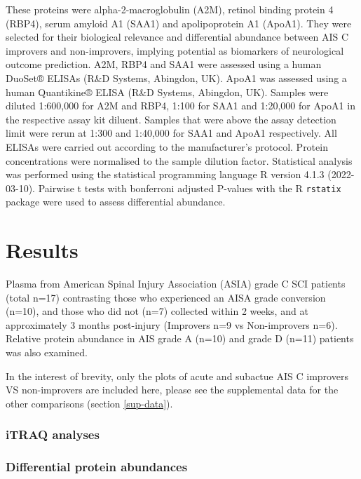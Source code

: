 \documentclass[9pt,lineno]{elife}
\begin{document}
These proteins were alpha-2-macroglobulin (A2M), retinol binding protein 4 (RBP4), serum amyloid A1 (SAA1) and apolipoprotein A1 (ApoA1).
They were selected for their biological relevance and differential abundance between AIS C improvers and non-improvers, implying potential as biomarkers of neurological outcome prediction.
A2M, RBP4 and SAA1 were assessed using a human DuoSet® ELISAs (R\&D Systems, Abingdon, UK).
ApoA1 was assessed using a human Quantikine® ELISA (R\&D Systems, Abingdon, UK).
Samples were diluted 1:600,000 for A2M and RBP4, 1:100 for SAA1 and 1:20,000 for ApoA1 in the respective assay kit diluent.
Samples that were above the assay detection limit were rerun at 1:300 and 1:40,000 for SAA1 and ApoA1 respectively.
All ELISAs were carried out according to the manufacturer's protocol.
Protein concentrations were normalised to the sample dilution factor.
Statistical analysis was performed using the statistical programming language R version 4.1.3 (2022-03-10).
Pairwise t tests with bonferroni adjusted P-values with the R \texttt{rstatix} package were used to assess differential abundance.

\hypertarget{results-1}{%
\section{Results}\label{results-1}}

Plasma from American Spinal Injury Association (ASIA) grade C SCI patients (total n=17) contrasting those who experienced an AISA grade conversion (n=10), and those who did not (n=7) collected within 2 weeks, and at approximately 3 months post-injury (Improvers n=9 vs Non-improvers n=6).
Relative protein abundance in AIS grade A (n=10) and grade D (n=11) patients was also examined.

In the interest of brevity, only the plots of acute and subactue AIS C improvers VS non-improvers are included here, please see the supplemental data for the other comparisons (section \ref{sup-data}).





\hypertarget{itraq-analyses}{%
\subsubsection{iTRAQ analyses}\label{itraq-analyses}}

\hypertarget{differential-protein-abundances}{%
\subsubsection{Differential protein abundances}\label{differential-protein-abundances}}
\end{document}
